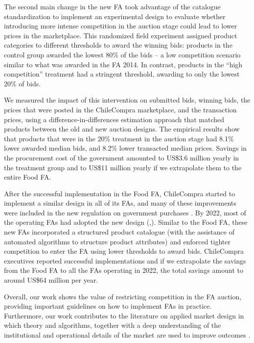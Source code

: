 The second main change in the new FA took advantage of the catalogue standardization to implement an experimental design to evaluate whether introducing more intense competition in the auction stage could lead to lower prices in the marketplace. This randomized field experiment assigned product categories to different thresholds to award the winning bids: products in the control group awarded the lowest 80\% of the bids -- a low competition scenario similar to what was awarded in the FA 2014. In contrast, products in the ``high competition'' treatment had a stringent threshold, awarding to only the lowest 20\% of bids.


We measured the impact of this intervention on submitted bids, winning bids, the prices that were posted in the ChileCompra marketplace, and the transaction prices, using a difference-in-differences estimation approach that matched products between the old and new auction designs. The empirical results show that products that were in the 20\%  treatment in the auction stage had 8.1\% lower awarded median bids, and 8.2\% lower transacted median prices. Savings in the procurement cost of the government amounted to US\$3.6 million  yearly  in the treatment group and to US\$11 million yearly if we extrapolate them to the entire Food FA.

After the successful implementation in the Food FA, ChileCompra started to implement a similar design in all of its FAs, and many of these improvements were included in the new regulation on government purchases \citep{leycompras}. By 2022, most of the operating FAs had adopted the new design    (\cite{cuentapublica2021},\cite{datosabiertos}).
Similar to the Food FA, these new FAs incorporated a structured product catalogue (with the assistance of automated algorithms to structure product attributes) and enforced tighter competition to enter the FA using lower thresholds to award bids. ChileCompra executives reported successful implementations and if we extrapolate the savings from the Food FA to all the FAs operating in 2022, the total savings amount to around US\$64 million per year.%

 Overall, our work shows the value of restricting competition in the FA auction, providing important guidelines on how to implement FAs in practice. Furthermore, our work contributes to the literature on applied market design in which  theory and algorithms, together with a deep understanding of the institutional and operational details of the market are used to improve outcomes \citep{vulkan2013handbook}.

